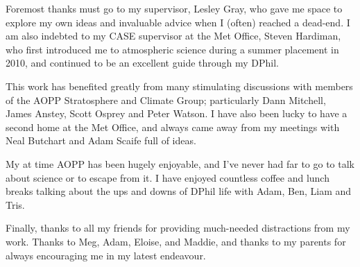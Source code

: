 \begin{acknowledgements}

  Foremost thanks must go to my supervisor, Lesley Gray, who gave me space to
  explore my own ideas and invaluable advice when I (often) reached a
  dead-end. I am also indebted to my CASE supervisor at the Met Office, Steven
  Hardiman, who first introduced me to atmospheric science during a summer
  placement in 2010, and continued to be an excellent guide through my DPhil.

  This work has benefited greatly from many stimulating discussions with members
  of the AOPP Stratosphere and Climate Group; particularly Dann Mitchell, James
  Anstey, Scott Osprey and Peter Watson. I have also been lucky to have a second
  home at the Met Office, and always came away from my meetings with Neal
  Butchart and Adam Scaife full of ideas.

  My at time AOPP has been hugely enjoyable, and I've never had far to go to
  talk about science or to escape from it. I have enjoyed countless coffee and
  lunch breaks talking about the ups and downs of DPhil life with Adam, Ben,
  Liam and Tris.

  Finally, thanks to all my friends for providing much-needed distractions from
  my work. Thanks to Meg, Adam, Eloise, and Maddie, and thanks to my parents for
  always encouraging me in my latest endeavour.


\end{acknowledgements}




